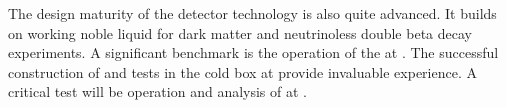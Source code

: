 The design maturity of the  detector technology is also
quite advanced. It builds on working noble liquid  for
dark matter and neutrinoless double beta decay experiments. A
significant benchmark is the operation of the  at
. The successful construction of  and tests in
the cold box at  provide invaluable experience. A critical
test will be operation and analysis of  at
.

